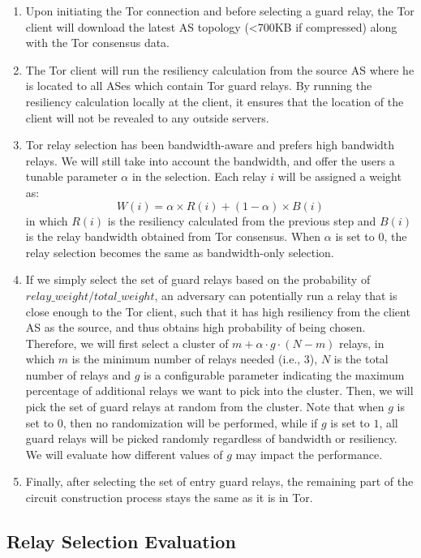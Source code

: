 \begin{enumerate}
\item Upon initiating the Tor connection and before selecting a guard relay, the Tor client will download the latest AS topology (<700KB if compressed) along with the Tor consensus data.
\item The Tor client will run the resiliency calculation from the source AS where he is located to all ASes which contain Tor guard relays. By running the resiliency calculation locally at the client, it ensures that the location of the client will not be revealed to any outside servers. 
\item Tor relay selection has been bandwidth-aware and prefers high bandwidth relays. We will still take into account the bandwidth, and offer the users a tunable parameter $\alpha$ in the selection. Each relay $i$ will be assigned a weight as:
\begin{equation*}
W(i) = \alpha \times R(i) + (1 - \alpha) \times B(i)
\end{equation*}
in which $R(i)$ is the resiliency calculated from the previous step and $B(i)$ is the relay bandwidth obtained from Tor consensus. When $\alpha$ is set to $0$, the relay selection becomes the same as bandwidth-only selection. 
\item If we simply select the set of guard relays based on the probability of $relay\_weight/total\_weight$, an adversary can potentially run a relay that is close enough to the Tor client, such that it has high resiliency from the client AS as the source, and thus obtains high probability of being chosen. Therefore, we will first select a cluster of $m + \alpha \cdot g \cdot (N - m)$ relays, in which $m$ is the minimum number of relays needed (i.e., 3), $N$ is the total number of relays and $g$ is a configurable parameter indicating the maximum percentage of additional relays we want to pick into the cluster. Then, we will pick the set of guard relays at random from the cluster. Note that when $g$ is set to $0$, then no randomization will be performed, while if $g$ is set to $1$, all guard relays will be picked randomly regardless of bandwidth or resiliency. We will evaluate how different values of $g$ may impact the performance. 
\item Finally, after selecting the set of entry guard relays, the remaining part of the circuit construction process stays the same as it is in Tor. 
\end{enumerate}

\subsection{Relay Selection Evaluation}


